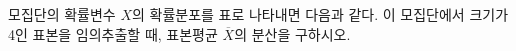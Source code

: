 모집단의 확률변수 $X$의 확률분포를 표로 나타내면 다음과 같다. 이 모집단에서 크기가 4인 표본을 임의추출할 때, 표본평균 $\overline{X}$의 분산을 구하시오. 
\par\smallskip\begin{center}\resizebox{\ifdim\width>\linewidth\linewidth\else\width\fi}{!}{}\end{center}
